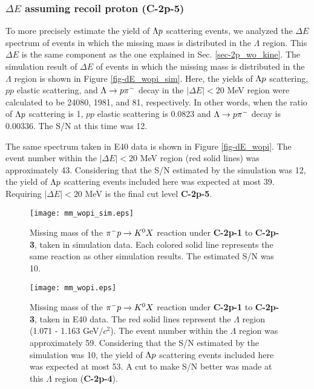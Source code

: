 \subsubsection{$\Delta E$ assuming recoil proton ({\bf C-2p-5})}

To more precisely estimate the yield of $\Lambda p$ scattering events, we analyzed the $\Delta E$ spectrum of events in which the missing mass is distributed in the $\Lambda$ region.
This $\Delta E$ is the same component as the one explained in Sec. \ref{sec-2p_wo_kine}.
The simulation result of $\Delta E$ of events in which the missing mass is distributed in the $\Lambda$ region is shown in Figure \ref{fig-dE_wopi_sim}. Here, the yields of $\Lambda p$ scattering, $pp$ elastic scattering, and $\Lambda\to p\pi^{-}$ decay in the $|\Delta E|<20$ MeV region were calculated to be 24080, 1981, and 81, respectively. In other words, when the ratio of $\Lambda p$ scattering is 1, $pp$ elastic scattering is 0.0823 and $\Lambda\to p\pi^{-}$ decay is 0.00336. The S/N at this time was 12.

The same spectrum taken in E40 data is shown in Figure \ref{fig-dE_wopi}. The event number within the $|\Delta E|<20$ MeV region (red solid lines) was approximately 43. Considering that the S/N estimated by the simulation was 12, the yield of $\Lambda p$ scattering events included here was expected at most 39. Requiring $|\Delta E|<20$ MeV is the final cut level {\bf C-2p-5}.

\begin{figure}[!h]
  \begin{center}
    \texttt{[image: mm\_wopi\_sim.eps]}
    \caption{Missing mass of the $\pi^- p \to K^0 X$ reaction under {\bf C-2p-1} to {\bf C-2p-3}, taken in simulation data. Each colored solid line represents the same reaction as other simulation results. The estimated S/N was 10.}
    \label{fig-mm_wopi_sim}
  \end{center}
\end{figure}

\begin{figure}[!h]
  \begin{center}
    \texttt{[image: mm\_wopi.eps]}
    \caption{Missing mass of the $\pi^- p \to K^0 X$ reaction under {\bf C-2p-1} to {\bf C-2p-3}, taken in E40 data. The red solid lines represent the $\Lambda$ region (1.071 - 1.163 GeV/$c^{2}$). The event number within the $\Lambda$ region was approximately 59. Considering that the S/N estimated by the simulation was 10, the yield of $\Lambda p$ scattering events included here was expected at most 53. A cut to make S/N better was made at this $\Lambda$ region ({\bf C-2p-4}).}
    \label{fig-mm_wopi}
  \end{center}
\end{figure}

